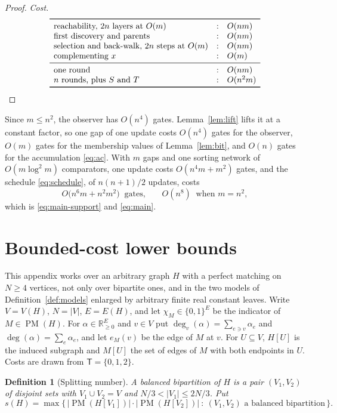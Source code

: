 \documentclass[11pt]{article}
\newtheorem{definition}[theorem]{Definition}
\newcommand{\PM}{\operatorname{PM}}
\begin{document}
\begin{proof}
\emph{Cost.}
\[
  \begin{array}{lcl}
    \toprule
    \text{reachability, } 2n \text{ layers at } O(m) & : & O(nm)\\
    \text{first discovery and parents} & : & O(nm)\\
    \text{selection and back-walk, } 2n \text{ steps at } O(m) & : & O(nm)\\
    \text{complementing } x & : & O(m)\\
    \midrule
    \text{one round} & : & O(nm)\\
    n \text{ rounds, plus } S \text{ and } T & : & O(n^{2}m)\\
    \bottomrule
  \end{array}
\]
\end{proof}

Since $m\le n^{2}$, the observer has $O(n^{4})$ gates.  Lemma~\ref{lem:lift}
lifts it at a constant factor, so one gap of one update costs $O(n^{4})$ gates
for the observer, $O(m)$ gates for the membership values of Lemma~\ref{lem:bit},
and $O(n)$ gates for the accumulation \eqref{eq:ac}.  With $m$ gaps and one
sorting network of $O(m\log^{2}m)$ comparators, one update costs
$O(n^{4}m+m^{2})$ gates, and the schedule \eqref{eq:schedule}, of $n(n+1)/2$
updates, costs
\[
  O\bigl(n^{6}m+n^{2}m^{2}\bigr)\ \text{ gates,}
  \qquad
  O(n^{8})\ \text{ when } m=n^{2},
\]
which is \eqref{eq:main-support} and \eqref{eq:main}.
\label{app:observer}
\label{app:count}

\section{Bounded-cost lower bounds}
\label{app:lower}

This appendix works over an arbitrary graph $H$ with a perfect matching on
$N\ge4$ vertices, not only over bipartite ones, and in the two models of
Definition~\ref{def:models} enlarged by arbitrary finite real constant leaves.
Write $V=V(H)$, $N=|V|$, $E=E(H)$, and let
$\chi_M\in\{0,1\}^{E}$ be the indicator of $M\in\PM(H)$.  For $\alpha\in\mathbb
R_{\ge0}^{E}$ and $v\in V$ put $\deg_v(\alpha)=\sum_{e\ni v}\alpha_e$ and
$\deg(\alpha)=\sum_e\alpha_e$, and let $e_M(v)$ be the edge of $M$ at $v$.  For
$U\subseteq V$, $H[U]$ is the induced subgraph and $M[U]$ the set of edges of
$M$ with both endpoints in $U$.  Costs are drawn from $\mathsf T=\{0,1,2\}$.

\begin{definition}[Splitting number]
\label{def:splitting}
A \emph{balanced bipartition} of $H$ is a pair $(V_1,V_2)$ of disjoint sets with
$V_1\cup V_2=V$ and $N/3<|V_1|\le 2N/3$.  Put
\[
  s(H)=\max\bigl\{\,|\PM(H[V_1])|\cdot|\PM(H[V_2])|\ :\ (V_1,V_2)
  \text{ a balanced bipartition}\,\bigr\}.
\]
\end{definition}
\end{document}
